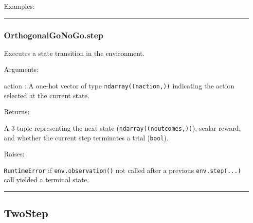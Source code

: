 Examples:

\begin{Shaded}
\begin{Highlighting}[]
\OperatorTok{=}
\end{Highlighting}
\end{Shaded}

\begin{center}\rule{0.5\linewidth}{\linethickness}\end{center}

\hypertarget{orthogonalgonogo.step}{%
\subsubsection{OrthogonalGoNoGo.step}\label{orthogonalgonogo.step}}

\begin{Shaded}
\begin{Highlighting}[]
\end{Highlighting}
\end{Shaded}

Executes a state transition in the environment.

Arguments:

action : A one-hot vector of type \texttt{ndarray((naction,))}
indicating the action selected at the current state.

Returns:

A 3-tuple representing the next state (\texttt{ndarray((noutcomes,))}),
scalar reward, and whether the current step terminates a trial
(\texttt{bool}).

Raises:

\texttt{RuntimeError} if \texttt{env.observation()} not called after a
previous \texttt{env.step(...)} call yielded a terminal state.

\begin{center}\rule{0.5\linewidth}{\linethickness}\end{center}

\hypertarget{twostep}{%
\subsection{TwoStep}\label{twostep}}

\begin{Shaded}
\begin{Highlighting}[]
\end{Highlighting}
\end{Shaded}


